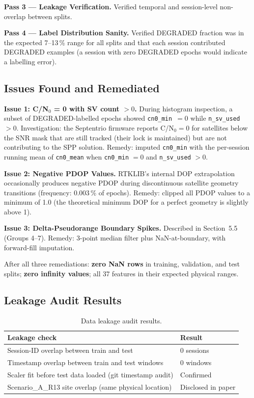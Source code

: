 \documentclass[12pt,a4paper]{article}
\newcommand{\code}[1]{\texttt{#1}}
\begin{document}
\textbf{Pass 3 --- Leakage Verification.}
Verified temporal and session-level non-overlap between splits.

\textbf{Pass 4 --- Label Distribution Sanity.}
Verified DEGRADED fraction was in the expected 7--13\,\% range for all splits and
that each session contributed DEGRADED examples (a session with zero DEGRADED epochs
would indicate a labelling error).

\subsection{Issues Found and Remediated}

\textbf{Issue 1: C/N$_0$ = 0 with SV count $> 0$.}
During histogram inspection, a subset of DEGRADED-labelled epochs showed
\code{cn0\_min}~$= 0$ while \code{n\_sv\_used}~$> 0$.
Investigation: the Septentrio firmware reports C/N$_0 = 0$ for satellites below the SNR
mask that are still tracked (their lock is maintained) but are not contributing to the
SPP solution.
Remedy: imputed \code{cn0\_min} with the per-session running mean of \code{cn0\_mean}
when \code{cn0\_min} $= 0$ and \code{n\_sv\_used} $> 0$.

\textbf{Issue 2: Negative PDOP Values.}
RTKLIB's internal DOP extrapolation occasionally produces negative PDOP during
discontinuous satellite geometry transitions (frequency: 0.003\,\% of epochs).
Remedy: clipped all PDOP values to a minimum of 1.0 (the theoretical minimum DOP for a
perfect geometry is slightly above 1).

\textbf{Issue 3: Delta-Pseudorange Boundary Spikes.}
Described in Section~5.5 (Groups 4--7).
Remedy: 3-point median filter plus NaN-at-boundary, with forward-fill imputation.

After all three remediations: \textbf{zero NaN rows} in training, validation, and test
splits; \textbf{zero infinity values}; all 37 features in their expected physical ranges.

\subsection{Leakage Audit Results}

\begin{table}[H]
  \centering
  \caption{Data leakage audit results.}
  \begin{tabular}{ll}
    \toprule
    \textbf{Leakage check} & \textbf{Result} \\
    \midrule
    Session-ID overlap between train and test & 0 sessions \\
    Timestamp overlap between train and test windows & 0 windows \\
    Scaler fit before test data loaded (git timestamp audit) & Confirmed \\
    Scenario\_A\_R13 site overlap (same physical location) & Disclosed in paper \\
    \bottomrule
  \end{tabular}
\end{table}
\end{document}
